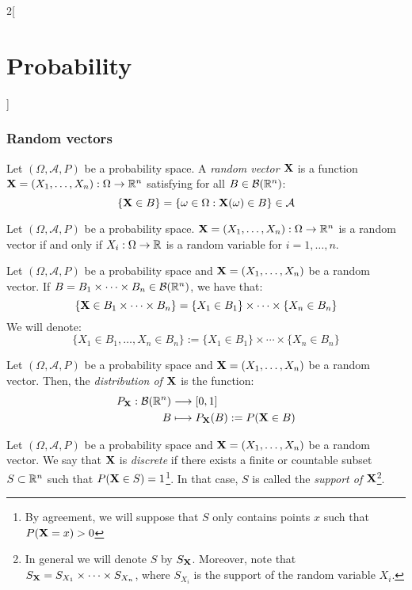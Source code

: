 \documentclass[../../../main.tex]{subfiles}
\begin{document}
\begin{multicols}{2}[\section{Probability}]
  \subsubsection{Random vectors}
  \begin{definition}
    Let $(\Omega,\mathcal{A},P)$ be a probability space. A \textit{random vector $\boldsymbol{\mathrm{X}}$} is a function $\boldsymbol{\mathrm{X}}=(X_1,\ldots,X_n):\Omega\rightarrow\mathbb{R}^n$ satisfying for all $B\in\mathcal{B}(\mathbb{R}^n)$: $$\{\boldsymbol{\mathrm{X}}\in B\}=\{\omega\in\Omega:\boldsymbol{\mathrm{X}}(\omega)\in B\}\in\mathcal{A}$$
  \end{definition}
  \begin{prop}
    Let $(\Omega,\mathcal{A},P)$ be a probability space. $\boldsymbol{\mathrm{X}}=(X_1,\ldots,X_n):\Omega\rightarrow\mathbb{R}^n$ is a random vector if and only if $X_i:\Omega\rightarrow\mathbb{R}$ is a random variable for $i=1,\ldots,n$.
  \end{prop}
  \begin{definition}
    Let $(\Omega,\mathcal{A},P)$ be a probability space and $\boldsymbol{\mathrm{X}}=(X_1,\ldots,X_n)$ be a random vector. If $B=B_1\times\cdots\times B_n\in\mathcal{B}(\mathbb{R}^n)$, we have that: $$\{\boldsymbol{\mathrm{X}}\in B_1\times\cdots\times B_n\}=\{X_1\in B_1\}\times\cdots\times\{X_n\in B_n\}$$ We will denote: $$\{X_1\in B_1,\ldots,X_n\in B_n\}:=\{X_1\in B_1\}\times\cdots\times\{X_n\in B_n\}$$
  \end{definition}
  \begin{definition}
    Let $(\Omega,\mathcal{A},P)$ be a probability space and $\boldsymbol{\mathrm{X}}=(X_1,\ldots,X_n)$ be a random vector. Then, the \textit{distribution of $\boldsymbol{\mathrm{X}}$} is the function:
    \begin{align*}
      P_{\boldsymbol{\mathrm{X}}}:\mathcal{B}(\mathbb{R}^n) & \longrightarrow[0,1]                                              \\
      B                                         & \longmapsto P_{\boldsymbol{\mathrm{X}}}(B):=P(\boldsymbol{\mathrm{X}}\in B)
    \end{align*}
  \end{definition}
  \begin{definition}
    Let $(\Omega,\mathcal{A},P)$ be a probability space and $\boldsymbol{\mathrm{X}}=(X_1,\ldots,X_n)$ be a random vector. We say that $\boldsymbol{\mathrm{X}}$ is \textit{discrete} if there exists a finite or countable subset $S\subset\mathbb{R}^n$ such that $P(\boldsymbol{\mathrm{X}}\in S)=1$\footnote{By agreement, we will suppose that $S$ only contains points $x$ such that $P (\boldsymbol{\mathrm{X}} = x) > 0$}. In that case, $S$ is called the \textit{support of $\boldsymbol{\mathrm{X}}$}\footnote{In general we will denote $S$ by $S_{\boldsymbol{\mathrm{X}}}$. Moreover, note that $S_{\boldsymbol{\mathrm{X}}}=S_{X_1}\times\cdots\times S_{X_n}$, where $S_{X_i}$ is the support of the random variable $X_i$.}.

\end{definition}
\end{multicols}
\end{document}
